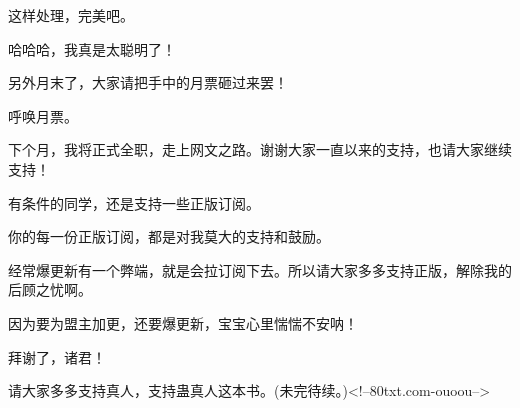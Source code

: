 \begin{this_body}
这样处理，完美吧。

哈哈哈，我真是太聪明了！

另外月末了，大家请把手中的月票砸过来罢！

呼唤月票。

下个月，我将正式全职，走上网文之路。谢谢大家一直以来的支持，也请大家继续支持！

有条件的同学，还是支持一些正版订阅。

你的每一份正版订阅，都是对我莫大的支持和鼓励。

经常爆更新有一个弊端，就是会拉订阅下去。所以请大家多多支持正版，解除我的后顾之忧啊。

因为要为盟主加更，还要爆更新，宝宝心里惴惴不安呐！

拜谢了，诸君！

请大家多多支持真人，支持蛊真人这本书。(未完待续。)<!--80txt.com-ouoou-->

\end{this_body}

